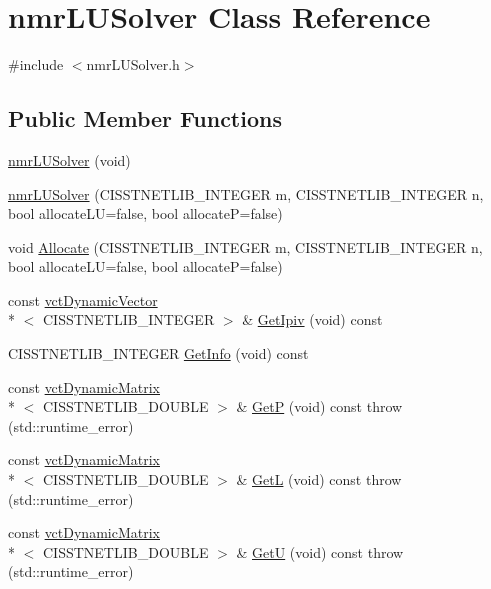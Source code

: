\hypertarget{classnmr_l_u_solver}{\section{nmr\-L\-U\-Solver Class Reference}
\label{classnmr_l_u_solver}
}


{\ttfamily \#include $<$nmr\-L\-U\-Solver.\-h$>$}

\subsection*{Public Member Functions}
\begin{DoxyCompactItemize}
\item 
\hyperlink{classnmr_l_u_solver_a40c3372d1d3cafb84e7fea271c415b32}{nmr\-L\-U\-Solver} (void)
\item 
\hyperlink{classnmr_l_u_solver_a2256f064d454e188084fbdae11d47dc6}{nmr\-L\-U\-Solver} (C\-I\-S\-S\-T\-N\-E\-T\-L\-I\-B\-\_\-\-I\-N\-T\-E\-G\-E\-R m, C\-I\-S\-S\-T\-N\-E\-T\-L\-I\-B\-\_\-\-I\-N\-T\-E\-G\-E\-R n, bool allocate\-L\-U=false, bool allocate\-P=false)
\item 
void \hyperlink{classnmr_l_u_solver_a3aafa2db62ce6f4325938e54bf285a64}{Allocate} (C\-I\-S\-S\-T\-N\-E\-T\-L\-I\-B\-\_\-\-I\-N\-T\-E\-G\-E\-R m, C\-I\-S\-S\-T\-N\-E\-T\-L\-I\-B\-\_\-\-I\-N\-T\-E\-G\-E\-R n, bool allocate\-L\-U=false, bool allocate\-P=false)
\item 
const \hyperlink{classvct_dynamic_vector}{vct\-Dynamic\-Vector}\\*
$<$ C\-I\-S\-S\-T\-N\-E\-T\-L\-I\-B\-\_\-\-I\-N\-T\-E\-G\-E\-R $>$ \& \hyperlink{classnmr_l_u_solver_ac4511fda0fb87a48e69d60edc4581cdf}{Get\-Ipiv} (void) const 
\item 
C\-I\-S\-S\-T\-N\-E\-T\-L\-I\-B\-\_\-\-I\-N\-T\-E\-G\-E\-R \hyperlink{classnmr_l_u_solver_a98347f4597679fa1175a4624419b8924}{Get\-Info} (void) const 
\item 
const \hyperlink{classvct_dynamic_matrix}{vct\-Dynamic\-Matrix}\\*
$<$ C\-I\-S\-S\-T\-N\-E\-T\-L\-I\-B\-\_\-\-D\-O\-U\-B\-L\-E $>$ \& \hyperlink{classnmr_l_u_solver_af8d3e46e6261ffa6272312622152c910}{Get\-P} (void) const   throw (std\-::runtime\-\_\-error)
\item 
const \hyperlink{classvct_dynamic_matrix}{vct\-Dynamic\-Matrix}\\*
$<$ C\-I\-S\-S\-T\-N\-E\-T\-L\-I\-B\-\_\-\-D\-O\-U\-B\-L\-E $>$ \& \hyperlink{classnmr_l_u_solver_a9d25755c14ae1c983da54325d793f1a8}{Get\-L} (void) const   throw (std\-::runtime\-\_\-error)
\item 
const \hyperlink{classvct_dynamic_matrix}{vct\-Dynamic\-Matrix}\\*
$<$ C\-I\-S\-S\-T\-N\-E\-T\-L\-I\-B\-\_\-\-D\-O\-U\-B\-L\-E $>$ \& \hyperlink{classnmr_l_u_solver_af4be769d987bb1a8df8a169d67c7c9ef}{Get\-U} (void) const   throw (std\-::runtime\-\_\-error)
\end{DoxyCompactItemize}
